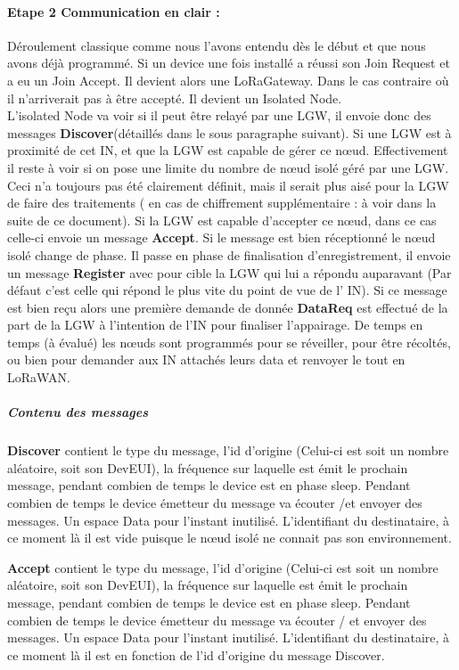 \documentclass[a4paper, 11pt]{article}
\begin{document}
\paragraph{Etape 2  Communication en clair : } Déroulement classique comme nous l'avons entendu dès le début et que nous avons déjà programmé. Si un device une fois installé a réussi son Join Request et a eu un Join Accept. Il devient alors une LoRaGateway. Dans le cas contraire où il n'arriverait pas à être accepté. Il devient un Isolated Node. \\
L'isolated Node va voir si il peut être relayé par une LGW, il envoie donc des messages \textbf{Discover}(détaillés dans le sous paragraphe suivant). Si une LGW est à proximité de cet IN, et que la LGW est capable de gérer ce n\oe{}ud. Effectivement il reste à voir si on pose une limite du nombre de n\oe{}ud isolé géré par une LGW. Ceci n'a toujours pas été clairement définit, mais il serait plus aisé pour la LGW de faire des traitements ( en cas de chiffrement supplémentaire : à voir dans la suite de ce document). Si la LGW est capable d'accepter ce n\oe{}ud, dans ce cas celle-ci envoie un message \textbf{Accept}. Si le message est bien réceptionné  le n\oe{}ud isolé change de phase. Il passe en phase de finalisation d'enregistrement, il envoie un message \textbf{Register} avec pour cible la LGW qui lui a répondu auparavant (Par défaut c'est celle qui répond le plus vite du point de vue de l' IN). Si ce message est bien reçu alors une première demande de donnée \textbf{DataReq} est effectué de la part de la LGW à l'intention de l'IN pour finaliser l'appairage. De temps en temps (à évalué) les n\oe{}uds sont programmés pour se réveiller, pour être récoltés, ou bien pour demander aux IN attachés leurs data et renvoyer le tout en LoRaWAN.\\
\subparagraph{Contenu des messages}

\textbf{Discover} contient le type du message, l'id d'origine (Celui-ci est soit un nombre aléatoire, soit son DevEUI), la fréquence sur laquelle est émit le prochain message, pendant combien de temps le device est en phase sleep. Pendant combien de temps le device émetteur du message va écouter /et envoyer des messages. Un espace Data pour l'instant inutilisé. L'identifiant du destinataire, à ce moment là il est vide puisque le n\oe{}ud isolé ne connait pas son environnement.

\textbf{Accept} contient le type du message, l'id d'origine (Celui-ci est soit un nombre aléatoire, soit son DevEUI), la fréquence sur laquelle est émit le prochain message, pendant combien de temps le device est en phase sleep. Pendant combien de temps le device émetteur du message va écouter / et envoyer des messages. Un espace Data pour l'instant inutilisé. L'identifiant du destinataire, à ce moment là il est en fonction de l'id d'origine du message Discover.
\end{document}
